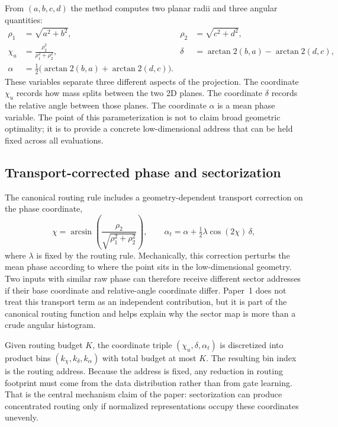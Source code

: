 \documentclass[11pt,letterpaper]{article}
\begin{document}
From $(a,b,c,d)$ the method computes two planar radii and three angular quantities:
\begin{align}
\rho_1 &= \sqrt{a^2+b^2}, &
\rho_2 &= \sqrt{c^2+d^2}, \\
\chi_u &= \frac{\rho_2^2}{\rho_1^2+\rho_2^2}, &
\delta &= \arctan2(b,a)-\arctan2(d,c), \\
\alpha &= \tfrac{1}{2}\bigl(\arctan2(b,a)+\arctan2(d,c)\bigr). &&
\end{align}
These variables separate three different aspects of the projection. The coordinate $\chi_u$ records how mass splits between the two 2D planes. The coordinate $\delta$ records the relative angle between those planes. The coordinate $\alpha$ is a mean phase variable. The point of this parameterization is not to claim broad geometric optimality; it is to provide a concrete low-dimensional address that can be held fixed across all evaluations.

\subsection{Transport-corrected phase and sectorization}
The canonical routing rule includes a geometry-dependent transport correction on the phase coordinate,
\begin{equation}
\chi = \arcsin\!\left(\frac{\rho_2}{\sqrt{\rho_1^2+\rho_2^2}}\right), \qquad
\alpha_t = \alpha + \tfrac{1}{2}\lambda \cos(2\chi)\,\delta,
\label{eq:transport}
\end{equation}
where $\lambda$ is fixed by the routing rule. Mechanically, this correction perturbs the mean phase according to where the point sits in the low-dimensional geometry. Two inputs with similar raw phase can therefore receive different sector addresses if their base coordinate and relative-angle coordinate differ. Paper~1 does not treat this transport term as an independent contribution, but it is part of the canonical routing function and helps explain why the sector map is more than a crude angular histogram.

Given routing budget $K$, the coordinate triple $(\chi_u,\delta,\alpha_t)$ is discretized into product bins $(k_\chi,k_\delta,k_\alpha)$ with total budget at most $K$. The resulting bin index is the routing address. Because the address is fixed, any reduction in routing footprint must come from the data distribution rather than from gate learning. That is the central mechanism claim of the paper: sectorization can produce concentrated routing only if normalized representations occupy these coordinates unevenly.
\end{document}
